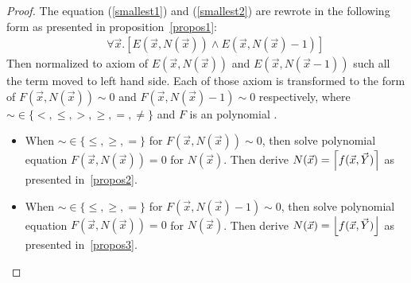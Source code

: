 \documentclass[12pt]{extarticle}
\DeclarePairedDelimiter\ceil{\lceil}{\rceil}
\DeclarePairedDelimiter\floor{\lfloor}{\rfloor}
\theoremstyle{definition}
\begin{document}
\begin{proof}
The equation (\ref{smallest1}) and (\ref{smallest2}) are rewrote in the following form as presented in proposition~\ref{propos1}:
\begin{eqnarray}
    &&\forall \vec{x}.[E(\vec{x},N(\vec{x})) \land E(\vec{x},N(\vec{x})-1)] \label{smallest3}
\end{eqnarray}
Then normalized to axiom of $E(\vec{x},N(\vec{x}))$ and $E(\vec{x},N(\vec{x}-1))$ such all the term moved to left hand side. Each of those axiom is transformed to the form of $F(\vec{x},N(\vec{x}))\sim 0$ and $F(\vec{x},N(\vec{x})-1)\sim 0$ respectively, where  $\sim \in \{<, \leq, >, \geq, =, \not=\}$ and $F$ is an polynomial .
\begin{itemize}
    \item When $\sim \in \{\leq, \geq, =\}$ for $F(\vec{x},N(\vec{x}))\sim 0$, then solve polynomial equation $F(\vec{x},N(\vec{x}))= 0$ for $N(\vec{x})$. 
    Then derive $N(\vec{x}) = \ceil*{f(\vec{x},\vec{Y})}$ as presented in~\ref{propos2}.
    \item When $\sim \in \{\leq, \geq, =\}$ for $F(\vec{x},N(\vec{x})-1)\sim 0$, then solve polynomial equation $F(\vec{x},N(\vec{x}))= 0$ for $N(\vec{x})$. 
    Then derive $N(\vec{x}) = \floor*{f(\vec{x},\vec{Y})}$ as presented in~\ref{propos3}.
\end{itemize}
\end{proof}
\end{document}
